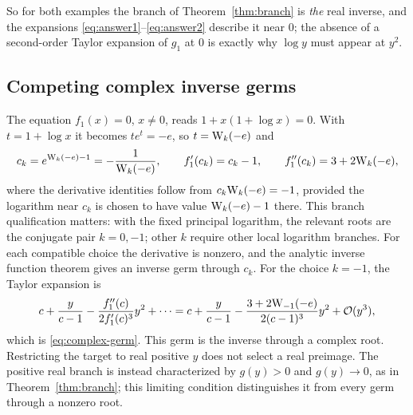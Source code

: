 So for both examples the branch of Theorem~\ref{thm:branch} is \emph{the} real inverse, and the expansions \eqref{eq:answer1}--\eqref{eq:answer2} describe it near $0$; the absence of a second-order Taylor expansion of $g_1$ at $0$ is exactly why $\log y$ must appear at $y^2$.

\subsection{Competing complex inverse germs}

The equation $f_1(x)=0$, $x\ne0$, reads $1+x(1+\log x)=0$. With $t=1+\log x$ it becomes $te^t=-e$, so $t=\mathrm W_k(-e)$ and
\begin{equation}
 c_k=e^{\mathrm W_k(-e)-1}=-\frac1{\mathrm W_k(-e)},\qquad f_1'(c_k)=c_k-1,\qquad f_1''(c_k)=3+2\mathrm W_k(-e),
 \label{eq:complex-root}
\end{equation}
where the derivative identities follow from $c_k\mathrm W_k(-e)=-1$, provided the logarithm near $c_k$ is chosen to have value $\mathrm W_k(-e)-1$ there. This branch qualification matters: with the fixed principal logarithm, the relevant roots are the conjugate pair $k=0,-1$; other $k$ require other local logarithm branches. For each compatible choice the derivative is nonzero, and the analytic inverse function theorem gives an inverse germ through $c_k$. For the choice $k=-1$, the Taylor expansion is
\[
 c+\frac{y}{c-1}-\frac{f_1''(c)}{2f_1'(c)^3}y^2+\cdots=c+\frac{y}{c-1}-\frac{3+2\mathrm W_{-1}(-e)}{2(c-1)^3}y^2+\mathcal O(y^3),
\]
which is \eqref{eq:complex-germ}. This germ is the inverse through a complex root. Restricting the target to real positive $y$ does not select a real preimage. The positive real branch is instead characterized by $g(y)>0$ and $g(y)\to0$, as in Theorem~\ref{thm:branch}; this limiting condition distinguishes it from every germ through a nonzero root.
